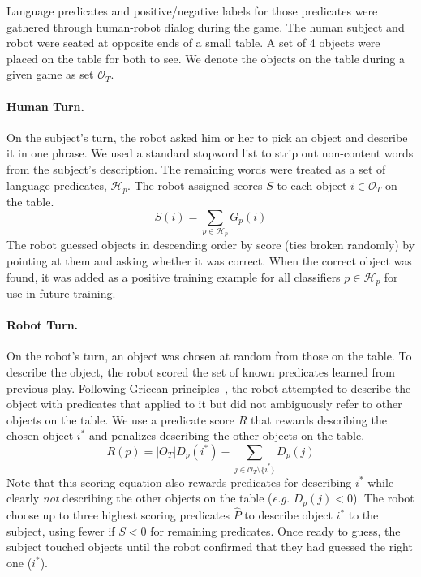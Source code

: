 Language predicates and positive/negative labels for those predicates were gathered through human-robot dialog during the \ispy game.
The human subject and robot were seated at opposite ends of a small table.
A set of 4 objects were placed on the table for both to see.
We denote the objects on the table during a given game as set $\mathcal{O}_T$.

\paragraph{Human Turn.} On the subject's turn, the robot asked him or her to pick an object and describe it in one phrase.
We used a standard stopword list to strip out non-content words from the subject's description.
The remaining words were treated as a set of language predicates, $\mathcal{H}_p$.
The robot assigned scores $S$ to each object $i\in \mathcal{O}_T$ on the table.
\begin{equation}
	S(i) = \sum_{p\in \mathcal{H}_p}{G_p(i)}
\end{equation}
The robot guessed objects in descending order by score (ties broken randomly) by pointing at them and asking whether it was correct.
When the correct object was found, it was added as a positive training example for all classifiers  $p\in \mathcal{H}_p$ for use in future training.

\paragraph{Robot Turn.} On the robot's turn, an object was chosen at random from those on the table.
To describe the object, the robot scored the set of known predicates learned from previous play.
Following Gricean principles~\cite{grice:bkchapter75}, the robot attempted to describe the object with predicates that applied to it but did not ambiguously refer to other objects on the table.
We use a predicate score $R$ that rewards describing the chosen object $i^*$ and penalizes describing the other objects on the table.
\begin{equation}
	R(p) = |O_T|D_p(i^*) - \sum_{j\in{\mathcal{O}_T}\setminus\{i^*\}}{D_p(j)}
\end{equation}
Note that this scoring equation also rewards predicates for describing $i^*$ while clearly {\it not} describing the other objects on the table (\textit{e.g.}  $D_p(j)<0$).
The robot choose up to three highest scoring predicates $\hat{P}$ to describe object $i^*$ to the subject, using fewer if $S<0$ for remaining predicates.
Once ready to guess, the subject touched objects until the robot confirmed that they had guessed the right one ($i^*$).

